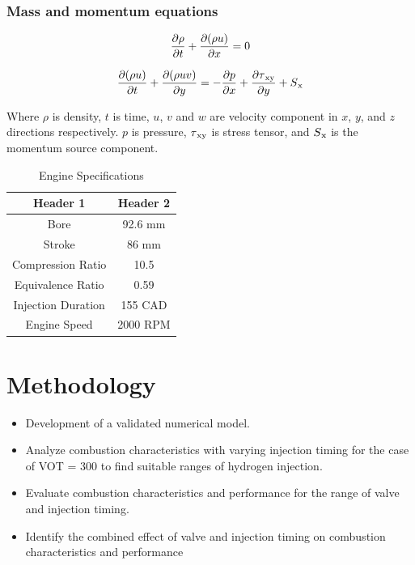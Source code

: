 \documentclass[conference]{IEEEtran}
\begin{document}
\subsubsection{Mass and momentum equations}

    \begin{gather*}
        \pdv{\rho}{t} + \pdv{(\rho u)}{ x} = 0
    \end{gather*}

    \begin{gather*}
        \pdv{(\rho u)}{t} + \pdv{(\rho uv)}{y} = - \pdv{p}{x} + \pdv{\tau\textsubscript{xy}}{y} + S\textsubscript{x}
    \end{gather*}

Where $\rho$ is density, $t$ is time, $u$, $v$ and $w$ are velocity component in $x$, $y$, and $z$ directions respectively. 
$p$ is pressure, $\tau\textsubscript{xy}$ is stress tensor, and $S\textsubscript{x}$ is the momentum source component.



\begin{table}[!ht]
    \centering
    \caption{Engine Specifications}
    \label{your_label_here}
    \begin{tabular}{|c|c|}
    \hline
    Header 1 & Header 2 \\
    \hline
    Bore & 92.6 mm \\
    Stroke & 86 mm \\
    Compression Ratio & 10.5 \\
    Equivalence Ratio & 0.59 \\
    Injection Duration & 155 CAD \\
    Engine Speed & 2000 RPM \\
    \hline
    \end{tabular}
    \end{table}

\section{Methodology}
\begin{itemize}
    \item Development of a validated numerical model.
    \item Analyze combustion characteristics with varying injection timing for the case of VOT = 300 to find suitable ranges of hydrogen injection.
    \item Evaluate combustion characteristics and performance for the range of valve and injection timing.
    \item Identify the combined effect of valve and injection timing on combustion characteristics and performance
\end{itemize}
\end{document}
